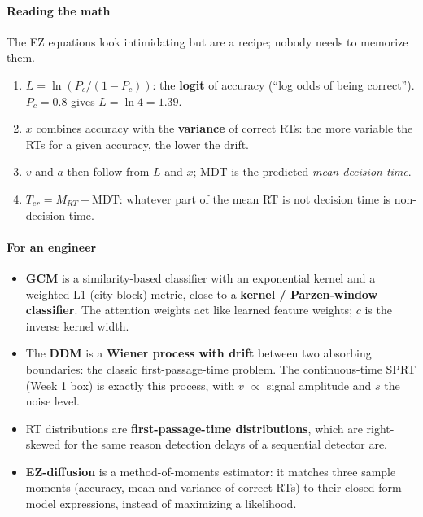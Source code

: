 \paragraph{Reading the math}

The EZ equations look intimidating but are a recipe; nobody needs to
memorize them.

\begin{enumerate}
\def\labelenumi{\arabic{enumi}.}
\tightlist
\item
  \(L = \ln(P_c/(1-P_c))\): the \textbf{logit} of accuracy (``log odds
  of being correct''). \(P_c = 0.8\) gives \(L = \ln 4 = 1.39\).
\item
  \(x\) combines accuracy with the \textbf{variance} of correct RTs: the
  more variable the RTs for a given accuracy, the lower the drift.
\item
  \(v\) and \(a\) then follow from \(L\) and \(x\); \(\mathrm{MDT}\) is
  the predicted \emph{mean decision time}.
\item
  \(T_{er} = M_{RT} - \mathrm{MDT}\): whatever part of the mean RT is
  not decision time is non-decision time.
\end{enumerate}

\paragraph{For an engineer}

\begin{itemize}
\tightlist
\item
  \textbf{GCM} is a similarity-based classifier with an exponential
  kernel and a weighted L1 (city-block) metric, close to a
  \textbf{kernel / Parzen-window classifier}. The attention weights act
  like learned feature weights; \(c\) is the inverse kernel width.
\item
  The \textbf{DDM} is a \textbf{Wiener process with drift} between two
  absorbing boundaries: the classic first-passage-time problem. The
  continuous-time SPRT (Week 1 box) is exactly this process, with \(v\)
  \ensuremath{\propto} signal amplitude and \(s\) the noise level.
\item
  RT distributions are \textbf{first-passage-time distributions}, which
  are right-skewed for the same reason detection delays of a sequential
  detector are.
\item
  \textbf{EZ-diffusion} is a method-of-moments estimator: it matches
  three sample moments (accuracy, mean and variance of correct RTs) to
  their closed-form model expressions, instead of maximizing a
  likelihood.
\end{itemize}

